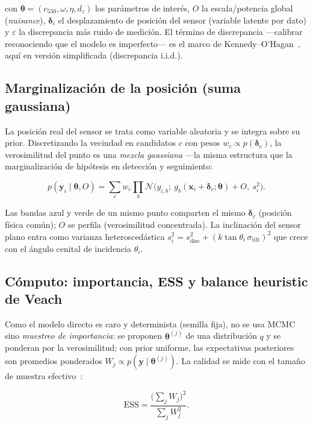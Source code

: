 \documentclass[11pt,a4paper]{article}
\begin{document}
con $\boldsymbol\theta=(c_{550},\omega,\eta,d_z)$ los parámetros de interés, $O$ la
escala/potencia global (\emph{nuisance}), $\boldsymbol\delta_i$ el desplazamiento de
posición del sensor (variable latente por dato) y $\varepsilon$ la discrepancia más
ruido de medición. El término de discrepancia —calibrar reconociendo que el modelo
es imperfecto— es el marco de Kennedy--O'Hagan~\cite{kennedy2001}, aquí en versión
simplificada (discrepancia i.i.d.).

\subsection{Marginalización de la posición (suma gaussiana)}

La posición real del sensor se trata como variable aleatoria y se integra sobre su
prior. Discretizando la vecindad en candidatos $c$ con pesos $w_c\propto
p(\boldsymbol\delta_c)$, la verosimilitud del punto es una \emph{mezcla gaussiana}
—la misma estructura que la marginalización de hipótesis en detección y seguimiento:

\begin{equation}
p(\mathbf{y}_i\mid\boldsymbol\theta,O) = \sum_c w_c \prod_b
\mathcal{N}\!\bigl(y_{i,b};\ g_b(\mathbf{x}_i+\boldsymbol\delta_c;\boldsymbol\theta)+O,\ s_i^2\bigr).
\label{eq:mixlike}
\end{equation}

Las bandas azul y verde de un mismo punto comparten el mismo
$\boldsymbol\delta_c$ (posición física común); $O$ se perfila (verosimilitud
concentrada). La inclinación del sensor plano entra como varianza heteroscedástica
$s_i^2 = s_\text{disc}^2 + (k\tan\theta_i\,\sigma_\text{tilt})^2$ que crece con el
ángulo cenital de incidencia $\theta_i$.

\subsection{Cómputo: importancia, ESS y balance heuristic de Veach}\label{sec:mis}

Como el modelo directo es caro y determinista (semilla fija), no se usa MCMC sino
\emph{muestreo de importancia}: se proponen $\boldsymbol\theta^{(j)}$ de una
distribución $q$ y se ponderan por la verosimilitud; con prior uniforme, las
expectativas posteriores son promedios ponderados $W_j\propto
p(\mathbf{y}\mid\boldsymbol\theta^{(j)})$. La calidad se mide con el tamaño de
muestra efectivo~\cite{kong1994}:

\begin{equation}
\mathrm{ESS} = \frac{\bigl(\sum_j W_j\bigr)^2}{\sum_j W_j^2}.
\label{eq:ess}
\end{equation}
\end{document}

